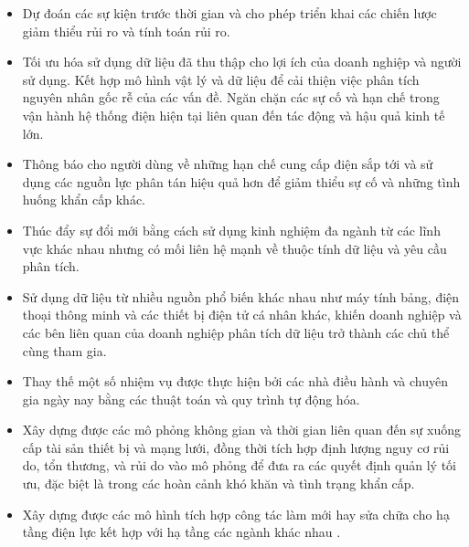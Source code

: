 \documentclass[utf8]{frontiersSCNS} %
\begin{document}
\begin{itemize}
\item Dự đoán các sự kiện trước thời gian và cho phép triển khai các chiến lược giảm thiểu rủi ro và tính toán rủi ro.

\item Tối ưu hóa sử dụng dữ liệu đã thu thập cho lợi ích của doanh nghiệp và người sử dụng. Kết hợp mô hình vật lý và dữ liệu để cải thiện việc phân tích nguyên nhân gốc rễ của các vấn đề. Ngăn chặn các sự cố và hạn chế trong vận hành hệ thống điện hiện tại liên quan đến tác động và hậu quả kinh tế lớn.

\item Thông báo cho người dùng về những hạn chế cung cấp điện sắp tới và sử dụng các nguồn lực phân tán hiệu quả hơn để giảm thiểu sự cố và những tình huống khẩn cấp khác.

\item Thúc đẩy sự đổi mới bằng cách sử dụng kinh nghiệm đa ngành từ các lĩnh vực khác nhau nhưng có mối liên hệ mạnh về thuộc tính dữ liệu và yêu cầu phân tích.

\item Sử dụng dữ liệu từ nhiều nguồn phổ biến khác nhau như máy tính bảng, điện thoại thông minh và các thiết bị điện tử cá nhân khác, khiến doanh nghiệp và các bên liên quan của doanh nghiệp phân tích dữ liệu trở thành các chủ thể cùng tham gia.

\item Thay thế một số nhiệm vụ được thực hiện bởi các nhà điều hành và chuyên gia ngày nay bằng các thuật toán và quy trình tự động hóa.

\item Xây dựng được các mô phỏng không gian và thời gian liên quan đến sự xuống cấp tài sản thiết bị và mạng lưới, đồng thời tích hợp định lượng nguy cơ rủi do, tổn thương, và rủi do vào mô phỏng để đưa ra các quyết định quản lý tối ưu, đặc biệt là trong các hoàn cảnh khó khăn và tình trạng khẩn cấp.

\item Xây dựng được các mô hình tích hợp công tác làm mới hay sửa chữa cho hạ tầng điện lực kết hợp với hạ tầng các ngành khác nhau \citep{Kielhauser2017}.
\end{itemize}




\end{document}
